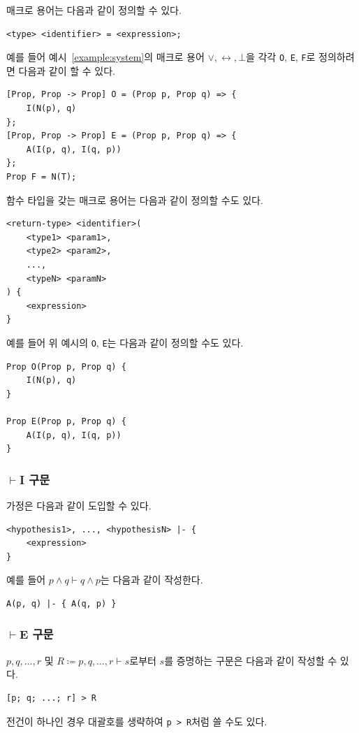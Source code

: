 \documentclass[10pt,twocolumn]{article}
\theoremstyle{definition}
\begin{document}
매크로 용어는 다음과 같이 정의할 수 있다.
\begin{lstlisting}
<type> <identifier> = <expression>;
\end{lstlisting}
예를 들어 예시~\ref{example:system}의 매크로 용어 $\lor, \leftrightarrow, \bot$을 각각 \verb!O!, \verb!E!, \verb!F!로 정의하려면 다음과 같이 할 수 있다.
\begin{lstlisting}
[Prop, Prop -> Prop] O = (Prop p, Prop q) => {
	I(N(p), q)
};
[Prop, Prop -> Prop] E = (Prop p, Prop q) => {
	A(I(p, q), I(q, p))
};
Prop F = N(T);
\end{lstlisting}

함수 타입을 갖는 매크로 용어는 다음과 같이 정의할 수도 있다.
\begin{lstlisting}
<return-type> <identifier>(
	<type1> <param1>,
	<type2> <param2>,
	...,
	<typeN> <paramN>
) {
	<expression>
}
\end{lstlisting}
예를 들어 위 예시의 \verb!O!, \verb!E!는 다음과 같이 정의할 수도 있다.
\begin{lstlisting}
Prop O(Prop p, Prop q) {
	I(N(p), q)	
}

Prop E(Prop p, Prop q) {
	A(I(p, q), I(q, p))
}
\end{lstlisting}

\subsubsection{\texorpdfstring{$\vdash$I}{⊦I} 구문}

가정은 다음과 같이 도입할 수 있다.
\begin{lstlisting}
<hypothesis1>, ..., <hypothesisN> |- {
	<expression>
}
\end{lstlisting}
예를 들어 $p\land q\vdash q\land p$는 다음과 같이 작성한다.
\begin{lstlisting}
A(p, q) |- { A(q, p) }
\end{lstlisting}

\subsubsection{\texorpdfstring{$\vdash$E}{⊦E} 구문}

$p, q, \ldots, r$ 및 $R\coloneqq p, q, \ldots, r\vdash s$로부터 $s$를 증명하는 구문은 다음과 같이 작성할 수 있다.
\begin{lstlisting}
[p; q; ...; r] > R
\end{lstlisting}
전건이 하나인 경우 대괄호를 생략하여 \verb!p > R!처럼 쓸 수도 있다.
\end{document}
